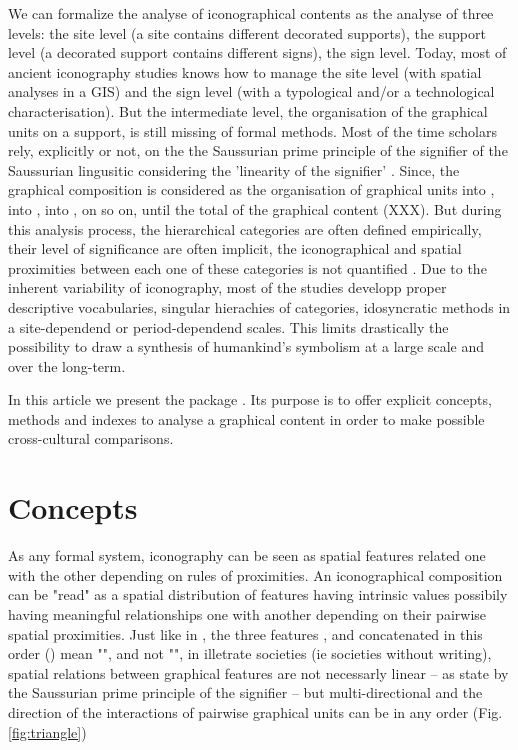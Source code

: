 \documentclass[article]{jss}
\begin{document}
We can formalize the analyse of iconographical contents as the analyse of three levels: the site level (a site contains different decorated supports), the support level (a decorated support contains different signs), the sign level. Today, most of ancient iconography studies knows how to manage the site level (with spatial analyses in a GIS) and the sign level (with a typological and/or a technological characterisation). But the intermediate level, the organisation of the graphical units on a support, is still missing of formal methods. Most of the time scholars rely, explicitly or not, on the the Saussurian prime principle of the signifier of the Saussurian lingusitic considering the 'linearity of the signifier' \citep{Saussure89}. Since, the graphical composition is considered as the organisation of graphical units into ,  into ,  into , on so on, until the total  of the graphical content (XXX). But during this analysis process, the hierarchical categories are often defined empirically, their level of significance are often implicit, the iconographical and spatial proximities between each one of these categories is not quantified \citep{Huet18a}. Due to the inherent variability of iconography, most of the studies developp proper descriptive vocabularies, singular hierachies of categories, idosyncratic methods in a site-dependend or period-dependend scales. This limits drastically the possibility to draw a synthesis of humankind's symbolism at a large scale and over the long-term. 

In this article we present the  package . Its purpose is to offer explicit concepts, methods and indexes to analyse a graphical content in order to make possible cross-cultural comparisons. 

\section[Concepts]{Concepts} \label{sec:concepts}

As any formal system, iconography can be seen as spatial features related one with the other depending on rules of proximities. An iconographical composition can be "read" as a spatial distribution of features having intrinsic values possibily having meaningful relationships one with another depending on their pairwise spatial proximities. Just like in , the three features ,  and  concatenated in this order () mean "", and not "", in illetrate societies (ie societies without writing), spatial relations between graphical features are not necessarly linear -- as state by the Saussurian prime principle of the signifier \cite{Saussure89} -- but multi-directional and the direction of the interactions of pairwise graphical units can be in any order (Fig. \ref{fig:triangle})
\end{document}
